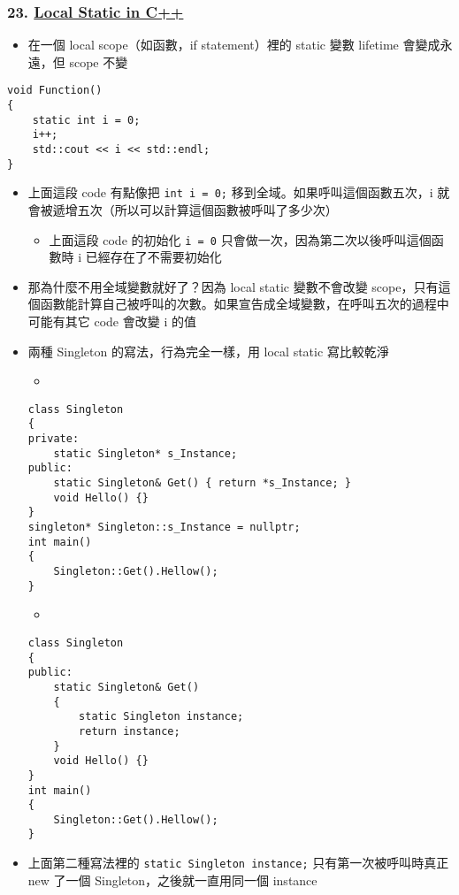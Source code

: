 \documentclass[11pt]{article}
\providecommand{\tightlist}{%
      \setlength{\itemsep}{0pt}\setlength{\parskip}{0pt}}
\begin{document}
\hypertarget{local-static-in-c}{%
\subsubsection{\texorpdfstring{23.
\href{https://www.youtube.com/watch?v=f7mtWD9GdJ4\&list=PLlrATfBNZ98dudnM48yfGUldqGD0S4FFb\&index=23}{Local
Static in C++}}{23. Local Static in C++}}\label{local-static-in-c}}

\begin{itemize}
\tightlist
\item
  在一個 local scope（如函數，if statement）裡的 static 變數 lifetime
  會變成永遠，但 scope 不變
\end{itemize}

\begin{verbatim}
void Function()
{
    static int i = 0;
    i++;
    std::cout << i << std::endl;
}
\end{verbatim}

\begin{itemize}
\tightlist
\item
  上面這段 code 有點像把 \texttt{int\ i\ =\ 0;}
  移到全域。如果呼叫這個函數五次，i
  就會被遞增五次（所以可以計算這個函數被呼叫了多少次）

  \begin{itemize}
  \tightlist
  \item
    上面這段 code 的初始化 \texttt{i\ =\ 0}
    只會做一次，因為第二次以後呼叫這個函數時 i 已經存在了不需要初始化
  \end{itemize}
\item
  那為什麼不用全域變數就好了？因為 local static 變數不會改變
  scope，只有這個函數能計算自己被呼叫的次數。如果宣告成全域變數，在呼叫五次的過程中可能有其它
  code 會改變 i 的值
\item
  兩種 Singleton 的寫法，行為完全一樣，用 local static 寫比較乾淨

  \begin{itemize}
  \tightlist
  \item
  \end{itemize}

\begin{verbatim}
class Singleton
{
private:
    static Singleton* s_Instance;
public:
    static Singleton& Get() { return *s_Instance; }
    void Hello() {}
}
singleton* Singleton::s_Instance = nullptr;
int main()
{
    Singleton::Get().Hellow();
}
\end{verbatim}

  \begin{itemize}
  \tightlist
  \item
  \end{itemize}

\begin{verbatim}
class Singleton
{
public:
    static Singleton& Get() 
    { 
        static Singleton instance;
        return instance; 
    }
    void Hello() {}
}
int main()
{
    Singleton::Get().Hellow();
}
\end{verbatim}
\item
  上面第二種寫法裡的 \texttt{static\ Singleton\ instance;}
  只有第一次被呼叫時真正 new 了一個 Singleton，之後就一直用同一個
  instance
\end{itemize}
\end{document}
